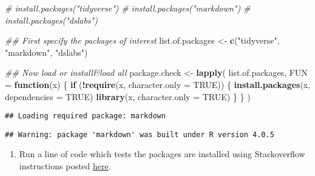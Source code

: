 \documentclass[
]{article}
\newenvironment{Shaded}{\begin{snugshade}}{\end{snugshade}}
\newcommand{\CommentTok}[1]{\textcolor[rgb]{0.56,0.35,0.01}{\textit{#1}}}
\newcommand{\ControlFlowTok}[1]{\textcolor[rgb]{0.13,0.29,0.53}{\textbf{#1}}}
\newcommand{\DataTypeTok}[1]{\textcolor[rgb]{0.13,0.29,0.53}{#1}}
\newcommand{\KeywordTok}[1]{\textcolor[rgb]{0.13,0.29,0.53}{\textbf{#1}}}
\newcommand{\NormalTok}[1]{#1}
\newcommand{\OperatorTok}[1]{\textcolor[rgb]{0.81,0.36,0.00}{\textbf{#1}}}
\newcommand{\OtherTok}[1]{\textcolor[rgb]{0.56,0.35,0.01}{#1}}
\newcommand{\StringTok}[1]{\textcolor[rgb]{0.31,0.60,0.02}{#1}}
\providecommand{\tightlist}{%
  \setlength{\itemsep}{0pt}\setlength{\parskip}{0pt}}
\begin{document}
\begin{Shaded}
\begin{Highlighting}[]
\CommentTok{# install.packages("tidyverse")}
\CommentTok{# install.packages("markdown")}
\CommentTok{# install.packages("dslabs")}

\CommentTok{## First specify the packages of interest}
\NormalTok{list.of.packages <-}\StringTok{ }\KeywordTok{c}\NormalTok{(}\StringTok{"tidyverse"}\NormalTok{, }\StringTok{"markdown"}\NormalTok{, }\StringTok{"dslabs"}\NormalTok{)}

\CommentTok{## Now load or install&load all}
\NormalTok{package.check <-}\StringTok{ }\KeywordTok{lapply}\NormalTok{(}
\NormalTok{  list.of.packages,}
  \DataTypeTok{FUN =} \ControlFlowTok{function}\NormalTok{(x) \{}
    \ControlFlowTok{if}\NormalTok{ (}\OperatorTok{!}\KeywordTok{require}\NormalTok{(x, }\DataTypeTok{character.only =} \OtherTok{TRUE}\NormalTok{)) \{}
      \KeywordTok{install.packages}\NormalTok{(x, }\DataTypeTok{dependencies =} \OtherTok{TRUE}\NormalTok{)}
      \KeywordTok{library}\NormalTok{(x, }\DataTypeTok{character.only =} \OtherTok{TRUE}\NormalTok{)}
\NormalTok{    \}}
\NormalTok{  \}}
\NormalTok{)}
\end{Highlighting}
\end{Shaded}

\begin{verbatim}
## Loading required package: markdown
\end{verbatim}

\begin{verbatim}
## Warning: package 'markdown' was built under R version 4.0.5
\end{verbatim}

\begin{enumerate}
\def\labelenumi{\arabic{enumi}.}
\tightlist
\item
  Run a line of code which tests the packages are installed using
  Stackoverflow instructions posted
  \href{https://stackoverflow.com/questions/4090169/elegant-way-to-check-for-missing-packages-and-install-them}{here}.
\end{enumerate}

\begin{Shaded}
\end{Shaded}
\end{document}
